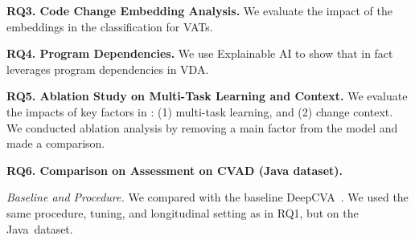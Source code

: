 







\noindent\textbf{RQ3. Code Change Embedding Analysis.} We evaluate the impact of the embeddings in the classification for VATs.

\noindent \textbf{RQ4. Program Dependencies.} We use
Explainable AI to show that {\tool} in fact leverages program
dependencies in VDA.



\vspace{1pt}
\noindent\textbf{RQ5. Ablation Study on Multi-Task Learning and
  Context.}  We evaluate the impacts of key factors in {\tool}: (1)
multi-task learning, and (2) change context. We conducted ablation analysis
by removing a main factor from the model and made a comparison.

\vspace{3pt}
\noindent\textbf{RQ6. Comparison on Assessment on CVAD (Java dataset).}

{\em Baseline and Procedure.} We compared {\tool} with the baseline
DeepCVA~\cite{deepCVA-ase21}. We used the same procedure, tuning, and
longitudinal setting as in RQ1, but on the Java~dataset.








